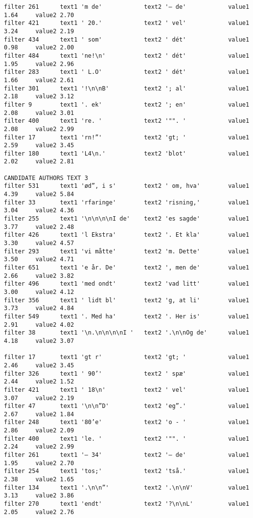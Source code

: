 {\begin{verbatim}
filter 261      text1 'm de'            text2 '– de'            value1 1.64     value2 2.70
filter 421      text1 ' 20.'            text2 ' vel'            value1 3.24     value2 2.19
filter 434      text1 ' som'            text2 ' dét'            value1 0.98     value2 2.00
filter 484      text1 'ne!\n'           text2 ' dét'            value1 1.95     value2 2.96
filter 283      text1 ' L.O'            text2 ' dét'            value1 1.66     value2 2.61
filter 301      text1 '!\n\nB'          text2 '; al'            value1 2.18     value2 3.12
filter 9        text1 '. ek'            text2 '; en'            value1 2.08     value2 3.01
filter 400      text1 're. '            text2 '"". '            value1 2.08     value2 2.99
filter 17       text1 'rn!”'            text2 'gt; '            value1 2.59     value2 3.45
filter 180      text1 'L4\n.'           text2 'blot'            value1 2.02     value2 2.81

CANDIDATE AUTHORS TEXT 3
filter 531      text1 'ød”, i s'        text2 ' om, hva'        value1 4.39     value2 5.84
filter 33       text1 'rfaringe'        text2 'risning,'        value1 3.04     value2 4.36
filter 255      text1 '\n\n\n\nI de'    text2 'es sagde'        value1 3.77     value2 2.48
filter 426      text1 'l Ekstra'        text2 '. Et kla'        value1 3.30     value2 4.57
filter 293      text1 'vi måtte'        text2 'm. Dette'        value1 3.50     value2 4.71
filter 651      text1 'e år. De'        text2 ', men de'        value1 2.66     value2 3.82
filter 496      text1 'med ondt'        text2 'vad litt'        value1 3.00     value2 4.12
filter 356      text1 ' lidt bl'        text2 'g, at li'        value1 3.73     value2 4.84
filter 549      text1 '. Med ha'        text2 '. Her is'        value1 2.91     value2 4.02
filter 38       text1 '\n.\n\n\n\nI '   text2 '.\n\nOg de'      value1 4.18     value2 3.07

filter 17       text1 'gt r'            text2 'gt; '            value1 2.46     value2 3.45
filter 326      text1 ' 90’'            text2 ' spæ'            value1 2.44     value2 1.52
filter 421      text1 ' 18\n'           text2 ' vel'            value1 3.07     value2 2.19
filter 47       text1 '\n\n”D'          text2 'eg”.'            value1 2.67     value2 1.84
filter 248      text1 '80’e'            text2 'o - '            value1 2.86     value2 2.09
filter 400      text1 'le. '            text2 '"". '            value1 2.24     value2 2.99
filter 261      text1 '– 34'            text2 '– de'            value1 1.95     value2 2.70
filter 254      text1 'tos;'            text2 'tså.'            value1 2.38     value2 1.65
filter 134      text1 '.\n\n”'          text2 '.\n\nV'          value1 3.13     value2 3.86
filter 270      text1 'endt'            text2 '?\n\nL'          value1 2.05     value2 2.76


\end{verbatim}}
